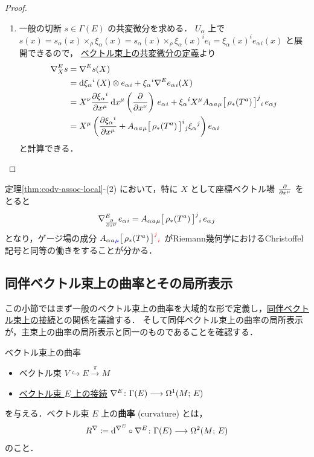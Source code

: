 \documentclass[TQFT_main]{subfiles}
\begin{document}
\begin{proof}
\begin{enumerate}
        \item 
        一般の切断 $s \in \Gamma(E)$ の共変微分を求める．
        $U_\alpha$ 上で $s(x) = s_\alpha(x) \times_\rho \xi_\alpha(x) = s_\alpha(x) \times_\rho \xi_\alpha(x)^i e_i = \xi_\alpha(x)^i e_\alpha{}_i(x)$ と展開できるので，
        \hyperref[def:connection-vect]{ベクトル束上の共変微分の定義}より
        \begin{align}
            \nabla^E_X s
            &= \nabla^E s(X) \\
            &= \dd{\xi_\alpha{}^i}(X) \otimes e_\alpha{}_i + \xi_\alpha{}^i \nabla^E e_\alpha{}_i(X) \\
            &= X^\nu \pdv{\xi_\alpha{}^{i}}{x^\mu} \dd{x^\mu} \left( \pdv{}{x^\nu} \right)\, e_\alpha{}_i  + \xi_\alpha{}^i X^\mu A_\alpha{}_a{}_\mu \bigl[\, \rho_* (T^a) \,\bigr]^j{}_i\,  e_\alpha{}_j \\
            &= X^\mu \left( \pdv{\xi_\alpha{}^{i}}{x^\mu} + A_\alpha{}_a{}_\mu \bigl[\, \rho_* (T^a) \,\bigr]^i{}_j \xi_\alpha{}^j \right) e_\alpha{}_i
        \end{align}
        と計算できる．
    \end{enumerate}

\end{proof}
                
定理\ref{thm:codv-assoc-local}-(2) において，特に $X$ として座標ベクトル場 $\pdv{}{x^\mu}$ をとると
\begin{align}
    \nabla^E_{\pdv{}{x^\mu}} e_\alpha{}_i = A_\alpha{}_a{}_\mu \bigl[\, \rho_* (T^a) \,\bigr]^j{}_i\,  e_\alpha{}_j
\end{align}
となり，ゲージ場の成分 $A_\alpha{}_a{}_{\textcolor{blue}{\mu}} \bigl[\, \rho_* (T^a) \,\bigr]^{\textcolor{red}{j}}{}_{\textcolor{red}{i}}$ がRiemann幾何学におけるChristoffel記号と同等の働きをすることが分かる．

\subsection{同伴ベクトル束上の曲率とその局所表示}

この小節ではまず一般のベクトル束上の曲率を大域的な形で定義し，\hyperref[thm:connection-assoc]{同伴ベクトル束上の接続}との関係を議論する．
そして同伴ベクトル束上の曲率の局所表示が，主束上の曲率の局所表示と同一のものであることを確認する．

\begin{mydef}[label=def:curvature-vect]{ベクトル束上の曲率}
    \begin{itemize}
        \item ベクトル束 $V \hookrightarrow E \xrightarrow{\pi} M$
        \item \hyperref[def:connection-vect]{ベクトル束 $E$ 上の接続} $\nabla^E \colon \Gamma(E) \longrightarrow \Omega^1(M;\, E)$
    \end{itemize}
    を与える．ベクトル束 $E$ 上の\textbf{曲率} (curvature) とは，
    \begin{align}
        R^\nabla \coloneqq \dd^{\nabla^E} \circ \nabla^E \colon \Gamma(E) \longrightarrow \Omega^2(M;\, E)
    \end{align}
    のこと．
\end{mydef}
\end{document}
